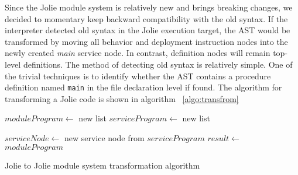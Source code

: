Since the Jolie module system is relatively new and brings breaking changes, we decided to momentary keep backward compatibility with the old syntax. If the interpreter detected old syntax in the Jolie execution target, the AST would be transformed by moving all behavior and deployment instruction nodes into the newly created \textit{main} service node. In contrast, definition nodes will remain top-level definitions. The method of detecting old syntax is relatively simple. One of the trivial techniques is to identify whether the AST contains a procedure definition named \texttt{main} in the file declaration level if found. The algorithm for transforming a Jolie code is shown in algorithm ~\ref{algo:transfrom}

\begin{algorithm}[ht]
    \begin{algorithmic}[1]

        \State $moduleProgram\gets$ new list
        \State $serviceProgram\gets$ new list

        \State {}
        \Else
        \State {}
        \EndIf
        \EndFor
        \State $serviceNode \gets$ new service node from $serviceProgram$
        \State {}
        \State $result \gets$ $moduleProgram$
        \EndProcedure

    \end{algorithmic}
    \caption{Jolie to Jolie module system transformation algorithm}
    \label{algo:transfrom}
\end{algorithm}
\FloatBarrier